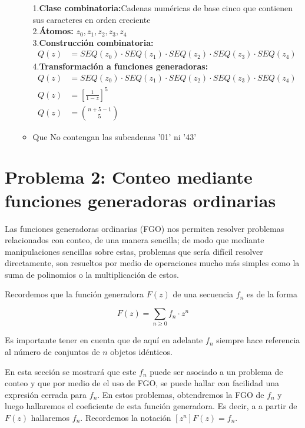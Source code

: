 \begin{enumerate}
\begin{itemize}
        1.\textbf{Clase combinatoria:}Cadenas numéricas de base cinco que contienen sus caracteres en orden creciente\\
        2.\textbf{Átomos:} $z_0, z_1, z_2, z_3, z_4$\\
        3.\textbf{Construcción combinatoria:}\\
        \begin{align*}
            Q(z) &= SEQ(z_0)\cdot SEQ(z_1)\cdot SEQ(z_2)\cdot SEQ(z_3)\cdot SEQ(z_4)
        \end{align*}
        4.\textbf{Transformación a funciones generadoras:}\\
        \begin{align*}
            Q(z) &= SEQ(z_0)\cdot SEQ(z_1)\cdot SEQ(z_2)\cdot SEQ(z_3)\cdot SEQ(z_4)\\
            Q(z) &= \left[\frac{1}{1-z}\right]^5\\
            Q(z) &= \binom{n+5-1}{5}
        \end{align*}
        \item Que No contengan las subcadenas '01' ni '43' 
    \end{itemize}
\end{enumerate}
\section*{Problema 2: Conteo mediante funciones generadoras ordinarias}
	
Las funciones generadoras ordinarias (FGO) nos permiten resolver problemas relacionados con conteo, de una manera sencilla; de modo que mediante manipulaciones sencillas sobre estas, problemas que sería difícil resolver directamente, son resueltos por medio de operaciones mucho más simples como la suma de polinomios o la multiplicación de estos.
	
Recordemos que la función generadora $F(z)$ de una secuencia $f_n$ es de la forma
	
$$F(z)=\sum_{n\geq0}{f_n\cdot z^n}$$
	
Es importante tener en cuenta que de aquí en adelante $f_n$ siempre hace referencia al número de conjuntos de $n$ objetos idénticos.
	
En esta sección se mostrará que este $f_n$ puede ser asociado a un problema de conteo y que por medio de el uso de FGO, se puede hallar con facilidad una expresión cerrada para $f_n$. En estos problemas, obtendremos la FGO de $f_n$ y luego hallaremos el coeficiente de esta función generadora. Es decir, a a partir de $F(z)$ hallaremos $f_n$. Recordemos la notación $[z^n]F(z)=f_n$.
	
